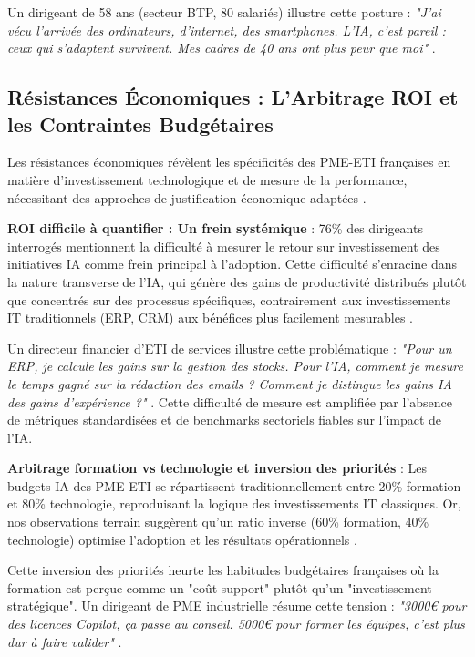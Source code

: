Un dirigeant de 58 ans (secteur BTP, 80 salariés) illustre cette posture : \emph{"J'ai vécu l'arrivée des ordinateurs, d'internet, des smartphones. L'IA, c'est pareil : ceux qui s'adaptent survivent. Mes cadres de 40 ans ont plus peur que moi"} \cite{luwai2025meetings}.

\subsection{Résistances Économiques : L'Arbitrage ROI et les Contraintes Budgétaires}

Les résistances économiques révèlent les spécificités des PME-ETI françaises en matière d'investissement technologique et de mesure de la performance, nécessitant des approches de justification économique adaptées \cite{kaplan1996balanced}.

\textbf{ROI difficile à quantifier : Un frein systémique} : 76\% des dirigeants interrogés mentionnent la difficulté à mesurer le retour sur investissement des initiatives IA comme frein principal à l'adoption. Cette difficulté s'enracine dans la nature transverse de l'IA, qui génère des gains de productivité distribués plutôt que concentrés sur des processus spécifiques, contrairement aux investissements IT traditionnels (ERP, CRM) aux bénéfices plus facilement mesurables \cite{brynjolfsson2017business}.

Un directeur financier d'ETI de services illustre cette problématique : \emph{"Pour un ERP, je calcule les gains sur la gestion des stocks. Pour l'IA, comment je mesure le temps gagné sur la rédaction des emails ? Comment je distingue les gains IA des gains d'expérience ?"} \cite{luwai2025meetings}. Cette difficulté de mesure est amplifiée par l'absence de métriques standardisées et de benchmarks sectoriels fiables sur l'impact de l'IA.

\textbf{Arbitrage formation vs technologie et inversion des priorités} : Les budgets IA des PME-ETI se répartissent traditionnellement entre 20\% formation et 80\% technologie, reproduisant la logique des investissements IT classiques. Or, nos observations terrain suggèrent qu'un ratio inverse (60\% formation, 40\% technologie) optimise l'adoption et les résultats opérationnels \cite{luwai2025meetings}.

Cette inversion des priorités heurte les habitudes budgétaires françaises où la formation est perçue comme un "coût support" plutôt qu'un "investissement stratégique". Un dirigeant de PME industrielle résume cette tension : \emph{"3000€ pour des licences Copilot, ça passe au conseil. 5000€ pour former les équipes, c'est plus dur à faire valider"} \cite{luwai2025meetings}.

